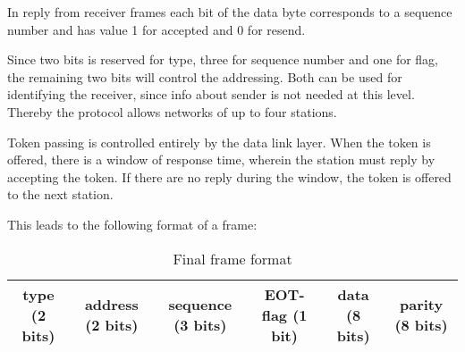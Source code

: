 In reply from receiver frames each bit of the data byte corresponds to a
sequence number and has value 1 for accepted and 0 for resend.

Since two bits is reserved for type, three for sequence number and one for flag,
the remaining two bits will control the addressing. Both can be used
for identifying the receiver, since info about sender is not needed at this
level. Thereby the protocol allows networks of up to four stations.

Token passing is controlled entirely by the data link layer. When the token is
offered, there is a window of response time, wherein the station must reply by accepting
the token. If there are no reply during the window, the token is offered to the
next station. 

This leads to the following format of a frame: 

\begin{table}[htb]
 \begin{center}
 \begin{tabular}{|c|c|c|c|c|c|}
  \hline
  type (2 bits) & address (2 bits) & sequence (3 bits) & EOT-flag (1 bit) & data (8 bits) & parity (8 bits)\\
  \hline
 \end{tabular}
 \end{center}
 \caption{Final frame format}
 \label{tab:final_frame_format}
\end{table}
